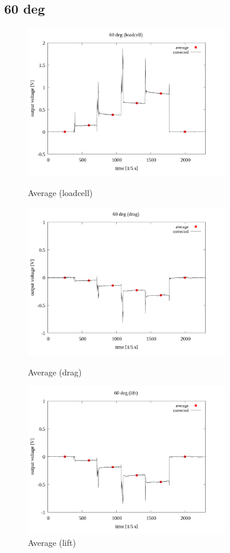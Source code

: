 \documentclass[twocolumn,a4j]{jsarticle}
\begin{document}
\newpage
\subsection{60 deg}
\begin{figure}[htbp]
    \footnotesize
    \begin{center}
        \includegraphics[width=88mm]{../images/average/60_loadcell_average.png}
        \caption{Average (loadcell)}
        \includegraphics[width=88mm]{../images/average/60_drag_average.png}
        \caption{Average (drag)}
        \includegraphics[width=88mm]{../images/average/60_lift_average.png}
        \caption{Average (lift)}
    \end{center}
\end{figure}
\end{document}
